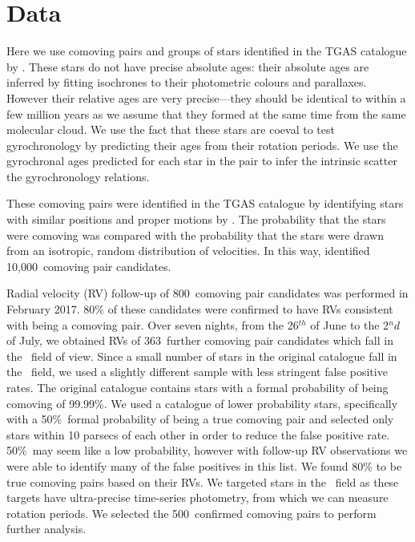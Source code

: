 \section{Data}
\label{sec:data}

\newcommand{\ncomoving}{10,000}
\newcommand{\nfollow}{800}
\newcommand{\nfollowme}{363}
\newcommand{\ohpercent}{80}
\newcommand{\mypercent}{80}
\newcommand{\nconfirmed}{500}
\newcommand{\pairprob}{99.99\%}
\newcommand{\badpairprob}{50\%}

Here we use comoving pairs and groups of stars identified in the TGAS
catalogue by \citet{Oh2016}.
These stars do not have precise absolute ages: their absolute ages are
inferred by fitting isochrones to their photometric colours and parallaxes.
However their relative ages are very precise---they should be identical to
within a few million years as we assume that they formed at the same time from
the same molecular cloud.
We use the fact that these stars are coeval to test gyrochronology by
predicting their ages from their rotation periods.
We use the gyrochronal ages predicted for each star in the pair to infer the
intrinsic scatter the gyrochronology relations.

These comoving pairs were identified in the TGAS catalogue by identifying
stars with similar positions and proper motions by \citet{Oh2016}.
The probability that the stars were comoving was compared with the probability
that the stars were drawn from an isotropic, random distribution of
velocities.
In this way, \citet{Oh2016} identified \ncomoving\ comoving pair candidates.

Radial velocity (RV) follow-up of \nfollow\ comoving pair candidates was
performed in February 2017.
\ohpercent\% of these candidates were confirmed to have RVs consistent with
being a comoving pair.
Over seven nights, from the 26$^{th}$ of June to the 2${^nd}$ of July, we
obtained RVs of \nfollowme\ further comoving pair candidates which fall in
the \kepler\ field of view.
Since a small number of stars in the original \citet{Oh2016} catalogue fall in
the \kepler\ field, we used a slightly different sample with less stringent
false positive rates.
The original catalogue contains stars with a formal probability of being
comoving of \pairprob.
We used a catalogue of lower probability stars, specifically with a
\badpairprob\ formal probability of being a true comoving pair and selected
only stars within 10 parsecs of each other in order to reduce the false
positive rate.
\badpairprob\ may seem like a low probability, however with follow-up RV
observations we were able to identify many of the false positives in this
list.
We found \mypercent\% to be true comoving pairs based on their RVs.
We targeted stars in the \kepler\ field as these targets have ultra-precise
time-series photometry, from which we can measure rotation periods.
We selected the \nconfirmed\ confirmed comoving pairs to perform further
analysis.
